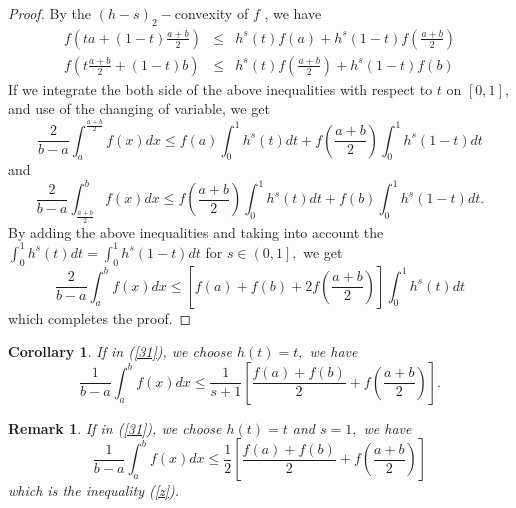 \documentclass{amsart}
\theoremstyle{plain}
\newtheorem{corollary}{Corollary}
\newtheorem{remark}{Remark}
\numberwithin{equation}{section}
\begin{document}
\begin{proof}
\bigskip By the $(h-s)_{2}-$convexity of $f$ , we have\begin{eqnarray*}
f\left( ta+\left( 1-t\right) \frac{a+b}{2}\right) &\leq &h^{s}\left(
t\right) f\left( a\right) +h^{s}\left( 1-t\right) f\left( \frac{a+b}{2}\right) \\
f\left( t\frac{a+b}{2}+\left( 1-t\right) b\right) &\leq &h^{s}\left(
t\right) f\left( \frac{a+b}{2}\right) +h^{s}\left( 1-t\right) f\left(
b\right)
\end{eqnarray*}If we integrate the both side of the above inequalities with respect to $t$
on $[0,1]$, and use of the changing of variable, we get\begin{equation*}
\frac{2}{b-a}\int_{a}^{\frac{a+b}{2}}f\left( x\right) dx\leq f\left(
a\right) \int_{0}^{1}h^{s}\left( t\right) dt+f\left( \frac{a+b}{2}\right)
\int_{0}^{1}h^{s}\left( 1-t\right) dt
\end{equation*}and\begin{equation*}
\frac{2}{b-a}\int_{\frac{a+b}{2}}^{b}f\left( x\right) dx\leq f\left( \frac{a+b}{2}\right) \int_{0}^{1}h^{s}\left( t\right)
dt+f(b)\int_{0}^{1}h^{s}\left( 1-t\right) dt.
\end{equation*}By adding the above inequalities and taking into account the $\int_{0}^{1}h^{s}\left( t\right) dt=\int_{0}^{1}h^{s}\left( 1-t\right) dt$
for $s\in \left( 0,1\right] ,$ we get\begin{equation*}
\frac{2}{b-a}\int_{a}^{b}f(x)dx\leq \left[ f\left( a\right) +f\left(
b\right) +2f\left( \frac{a+b}{2}\right) \right] \int_{0}^{1}h^{s}\left(
t\right) dt
\end{equation*}which completes the proof.
\end{proof}

\begin{corollary}
\bigskip If in (\ref{31}), we choose $h(t)=t,$ we have\begin{equation*}
\frac{1}{b-a}\int_{a}^{b}f(x)dx\leq \frac{1}{s+1}\left[ \frac{f\left(
a\right) +f\left( b\right) }{2}+f\left( \frac{a+b}{2}\right) \right] .
\end{equation*}\bigskip
\end{corollary}

\begin{remark}
If in (\ref{31}), we choose $h(t)=t$ and $s=1,$ we have\begin{equation*}
\frac{1}{b-a}\int_{a}^{b}f(x)dx\leq \frac{1}{2}\left[ \frac{f\left( a\right)
+f\left( b\right) }{2}+f\left( \frac{a+b}{2}\right) \right]
\end{equation*}which is the inequality (\ref{z}).
\end{remark}
\end{document}
